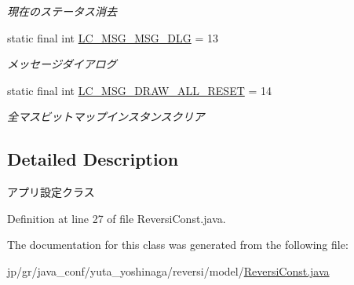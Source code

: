 \begin{DoxyCompactItemize}
\begin{DoxyCompactList}\small\item\em 現在のステータス消去 \end{DoxyCompactList}\item 
\mbox{\label{classjp_1_1gr_1_1java__conf_1_1yuta__yoshinaga_1_1reversi_1_1model_1_1_reversi_const_adc54c06fb744b9225dc5836b5c5ac1f7}} 
static final int \mbox{\hyperlink{classjp_1_1gr_1_1java__conf_1_1yuta__yoshinaga_1_1reversi_1_1model_1_1_reversi_const_adc54c06fb744b9225dc5836b5c5ac1f7}{L\+C\+\_\+\+M\+S\+G\+\_\+\+M\+S\+G\+\_\+\+D\+LG}} = 13
\begin{DoxyCompactList}\small\item\em メッセージダイアログ \end{DoxyCompactList}\item 
\mbox{\label{classjp_1_1gr_1_1java__conf_1_1yuta__yoshinaga_1_1reversi_1_1model_1_1_reversi_const_a9b8cbe7b567984747ec216658c1823e3}} 
static final int \mbox{\hyperlink{classjp_1_1gr_1_1java__conf_1_1yuta__yoshinaga_1_1reversi_1_1model_1_1_reversi_const_a9b8cbe7b567984747ec216658c1823e3}{L\+C\+\_\+\+M\+S\+G\+\_\+\+D\+R\+A\+W\+\_\+\+A\+L\+L\+\_\+\+R\+E\+S\+ET}} = 14
\begin{DoxyCompactList}\small\item\em 全マスビットマップインスタンスクリア \end{DoxyCompactList}\end{DoxyCompactItemize}


\subsection{Detailed Description}
アプリ設定クラス 

Definition at line 27 of file Reversi\+Const.\+java.



The documentation for this class was generated from the following file\+:\begin{DoxyCompactItemize}
\item 
jp/gr/java\+\_\+conf/yuta\+\_\+yoshinaga/reversi/model/\mbox{\hyperlink{_reversi_const_8java}{Reversi\+Const.\+java}}\end{DoxyCompactItemize}
